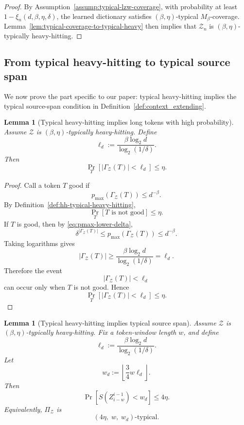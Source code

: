 \documentclass{article}
\theoremstyle{plain}
\newtheorem{lemma}[theorem]{Lemma}
\theoremstyle{definition}
\theoremstyle{remark}
\begin{document}
    \begin{proof}
    By Assumption~\ref{assump:typical-lzw-coverage}, with probability at least
    $1-\xi_n(d,\beta,\eta,\delta)$, the learned dictionary satisfies
    $(\beta,\eta)$-typical $M_\beta$-coverage. Lemma~\ref{lem:typical-coverage-to-typical-heavy}
    then implies that $\mathcal Z_n$ is $(\beta,\eta)$-typically heavy-hitting.
    \end{proof}
    
    \subsection{From typical heavy-hitting to typical source span}
    
    We now prove the part specific to our paper: typical heavy-hitting implies the
    typical source-span condition in Definition~\ref{def:context_extending}.
    
    \begin{lemma}[Typical heavy-hitting implies long tokens with high probability]
    \label{lem:hh-long-tokens}
    Assume $\mathcal Z$ is $(\beta,\eta)$-typically heavy-hitting. Define
    \[
        \ell_d
        :=
        \frac{\beta\log_2 d}{\log_2(1/\delta)}.
    \]
    Then
    \[
        \Pr_T\!\left[
            |\Gamma_{\mathcal Z}(T)|<\ell_d
        \right]
        \le \eta .
    \]
    \end{lemma}
    
    \begin{proof}
    Call a token $T$ good if
    \[
        p_{\max}\!\left(\Gamma_{\mathcal Z}(T)\right)\le d^{-\beta}.
    \]
    By Definition~\ref{def:hh-typical-heavy-hitting},
    \[
        \Pr_T[T\text{ is not good}]\le \eta.
    \]
    If $T$ is good, then by \eqref{eq:pmax-lower-delta},
    \[
        \delta^{|\Gamma_{\mathcal Z}(T)|}
        \le
        p_{\max}\!\left(\Gamma_{\mathcal Z}(T)\right)
        \le
        d^{-\beta}.
    \]
    Taking logarithms gives
    \[
        |\Gamma_{\mathcal Z}(T)|
        \ge
        \frac{\beta\log_2 d}{\log_2(1/\delta)}
        =
        \ell_d.
    \]
    Therefore the event
    \[
        |\Gamma_{\mathcal Z}(T)|<\ell_d
    \]
    can occur only when $T$ is not good. Hence
    \[
        \Pr_T\!\left[
            |\Gamma_{\mathcal Z}(T)|<\ell_d
        \right]
        \le \eta.
    \]
    \end{proof}
    
    \begin{lemma}[Typical heavy-hitting implies typical source span]
    \label{lem:hh-typical-source-span}
    Assume $\mathcal Z$ is $(\beta,\eta)$-typically heavy-hitting. Fix a
    token-window length $w$, and define
    \[
        \ell_d
        :=
        \frac{\beta\log_2 d}{\log_2(1/\delta)}.
    \]
    Let
    \[
        w_d
        :=
        \left\lfloor \frac{3}{4}w\ell_d \right\rfloor .
    \]
    Then
    \[
        \Pr\!\left[
            S(Z_{i-w}^{i-1}) < w_d
        \right]
        \le
        4\eta.
    \]
    Equivalently, $\Pi_{\mathcal Z}$ is
    \[
        \left(4\eta,\; w,\; w_d\right)\text{-typical}.
    \]
    \end{lemma}
    
\end{document}
